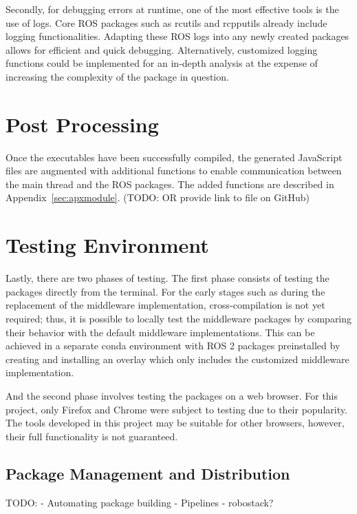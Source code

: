     Secondly, for debugging errors at runtime, one of the most effective tools is the use of logs. Core \ac{ROS} packages such as \textsf{rcutils} and \textsf{rcpputils} already include logging functionalities. Adapting these \ac{ROS} logs into any newly created packages allows for efficient and quick debugging. Alternatively, customized logging functions could be implemented for an in-depth analysis at the expense of increasing the complexity of the package in question.

\section{Post Processing}

    Once the executables have been successfully compiled, the generated JavaScript files are augmented with additional functions to enable communication between the main thread and the ROS packages. The added functions are described in Appendix~\ref{sec:apxmodule}. (TODO: OR provide link to file on GitHub)

\section{Testing Environment}

    Lastly, there are two phases of testing. The first phase consists of testing the packages directly from the terminal. For the early stages such as during the replacement of the middleware implementation, cross-compilation is not yet required; thus, it is possible to locally test the middleware packages by comparing their behavior with the default middleware implementations. This can be achieved in a separate \textsf{conda} environment with \ac{ROS} 2 packages preinstalled by creating and installing an overlay which only includes the customized middleware implementation.

    And the second phase involves testing the packages on a web browser. For this project, only Firefox and Chrome were subject to testing due to their popularity. The tools developed in this project may be suitable for other browsers, however, their full functionality is not guaranteed.


\subsection{Package Management and Distribution}

    TODO:
    - Automating package building
    - Pipelines
    - robostack?